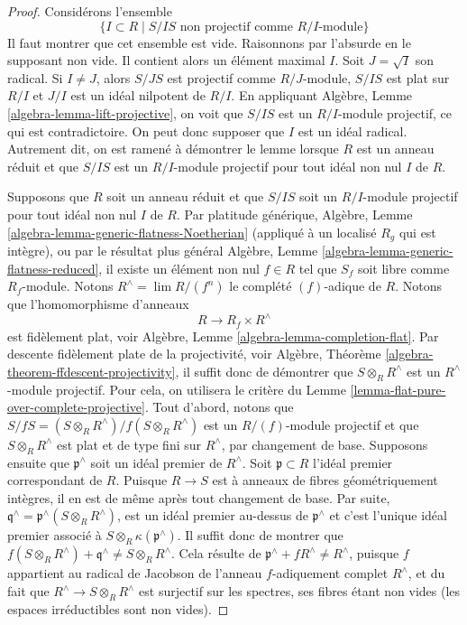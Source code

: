 \begin{proof}
Considérons l'ensemble
$$
\{I \subset R \mid S/IS\text{ non projectif comme }R/I\text{-module}\}
$$
Il faut montrer que cet ensemble est vide. Raisonnons par l'absurde en le supposant
non vide. Il contient alors un élément maximal $I$.
Soit $J = \sqrt{I}$ son radical. Si $I \not = J$, alors
$S/JS$ est projectif comme $R/J$-module, $S/IS$ est plat sur $R/I$
et $J/I$ est un idéal nilpotent de $R/I$. En appliquant
Algèbre, Lemme \ref{algebra-lemma-lift-projective},
on voit que $S/IS$ est un $R/I$-module projectif, ce qui est contradictoire.
On peut donc supposer que $I$ est un idéal radical. Autrement dit, on
est ramené à démontrer le lemme lorsque $R$ est un anneau réduit et que
$S/IS$ est un $R/I$-module projectif pour tout idéal non nul $I$
de $R$.

\medskip\noindent
Supposons que $R$ soit un anneau réduit et que $S/IS$ soit un $R/I$-module projectif
pour tout idéal non nul $I$ de $R$. Par platitude générique,
Algèbre, Lemme \ref{algebra-lemma-generic-flatness-Noetherian}
(appliqué à un localisé $R_g$ qui est intègre), ou par le résultat plus général
Algèbre, Lemme \ref{algebra-lemma-generic-flatness-reduced},
il existe un élément non nul $f \in R$ tel que $S_f$ soit libre comme
$R_f$-module. Notons $R^\wedge = \lim R/(f^n)$ le complété $(f)$-adique
de $R$. Notons que l'homomorphisme d'anneaux
$$
R \longrightarrow R_f \times R^\wedge
$$
est fidèlement plat, voir
Algèbre, Lemme \ref{algebra-lemma-completion-flat}.
Par descente fidèlement plate de la projectivité, voir
Algèbre, Théorème \ref{algebra-theorem-ffdescent-projectivity},
il suffit donc de démontrer que $S \otimes_R R^\wedge$ est un
$R^\wedge$-module projectif. Pour cela, on utilisera le critère du
Lemme \ref{lemma-flat-pure-over-complete-projective}.
Tout d'abord, notons que $S/fS = (S \otimes_R R^\wedge)/f(S \otimes_R R^\wedge)$
est un $R/(f)$-module projectif et que $S \otimes_R R^\wedge$ est plat
et de type fini sur $R^\wedge$, par changement de base.
Supposons ensuite que $\mathfrak p^\wedge$ soit un idéal premier
de $R^\wedge$. Soit $\mathfrak p \subset R$ l'idéal premier correspondant
de $R$. Puisque $R \to S$ est à anneaux de fibres géométriquement intègres,
il en est de même après tout changement de base. Par suite,
$\mathfrak q^\wedge = \mathfrak p^\wedge(S \otimes_R R^\wedge)$,
est un idéal premier au-dessus de $\mathfrak p^\wedge$
et c'est l'unique idéal premier associé à
$S \otimes_R \kappa(\mathfrak p^\wedge)$. Il suffit donc de montrer que
$f(S \otimes_R R^\wedge) + \mathfrak q^\wedge \not = S \otimes_R R^\wedge$.
Cela résulte de $\mathfrak p^\wedge + fR^\wedge \not = R^\wedge$, puisque
$f$ appartient au radical de Jacobson de l'anneau $f$-adiquement complet $R^\wedge$,
et du fait que $R^\wedge \to S \otimes_R R^\wedge$ est surjectif sur les spectres,
ses fibres étant non vides (les espaces irréductibles sont non vides).
\end{proof}

